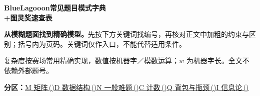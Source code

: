 \documentclass[10pt,a4paper]{article}
\begin{document}
\fontsize{10.5}{15}\selectfont

{\fontsize{18}{23}\selectfont\bfseries BlueLagooon常见题目模式字典\\+图灵奖速查表}\par\vspace{8pt}
\textbf{从模糊题面找到精确模型。}先按下方关键词找编号，再核对正文中加粗的约束与区别；括号内为页码。关键词仅作入口，不能代替适用条件。\par\vspace{5pt}
复杂度按赛场常用精确实现，数值按机器字／模数运算；$w$ 为机器字长。全文不依赖外部题号。\par\vspace{7pt}
\textbf{分区：}\quad\hyperref[secM]{M 矩阵\,(\pageref*{secM})}\quad\hyperref[secD]{D 数据结构\,(\pageref*{secD})}\quad\hyperref[secN]{N 一般难题\,(\pageref*{secN})}\quad\hyperref[secC]{C 计数\,(\pageref*{secC})}\quad\hyperref[secQ]{Q 背包与瓶颈\,(\pageref*{secQ})}\quad\hyperref[secI]{I 信息论\,(\pageref*{secI})}\par
\end{document}
